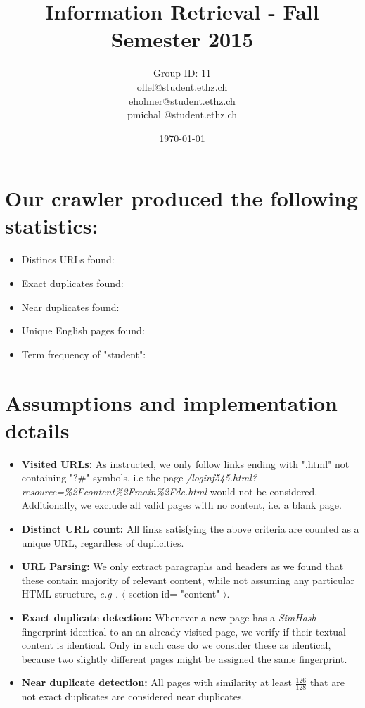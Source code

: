 \documentclass[a4paper, 11pt]{article}
\begin{document}
\title{Information Retrieval - Fall Semester 2015}
\author{Group ID: 11 \\ ollel@student.ethz.ch\\ eholmer@student.ethz.ch\\ pmichal
@student.ethz.ch\\}
\date{\today}
\maketitle

\section*{Our crawler produced the following statistics: } 
\begin{itemize}
  \item Distincs URLs found: 
  \item Exact duplicates found:
  \item Near duplicates found:
  \item Unique English pages found: 
  \item Term frequency of "student":  
\end{itemize}

\section*{Assumptions and implementation details }

\begin{itemize}
  \item \textbf{Visited URLs:} As instructed, we only follow links ending with ".html" not containing "?\#" symbols, i.e the page \textit{/loginf545.html?resource=\%2Fcontent\%2Fmain\%2Fde.html} would not be considered. Additionally, we exclude all valid pages with no content, i.e. a blank page.
  
 \item \textbf{Distinct URL count:} All links satisfying the above criteria are counted as a unique URL, regardless of duplicities.
  
  \item \textbf{URL Parsing:} We only extract paragraphs and headers as we found that these contain majority of relevant content, while not assuming any particular HTML structure, \textit{e.g
  .} $\langle$ section id= "content" $\rangle$.
  
  \item \textbf{Exact duplicate detection:} Whenever a new page has a \textit{SimHash} fingerprint identical to an an already visited page, we verify if their textual content is identical. Only in such case do we consider these as identical, because two slightly different pages might be assigned the same fingerprint.
  
  \item \textbf{Near duplicate detection:} All pages with similarity at least $\frac{126}{128}$ that are not exact duplicates are considered near duplicates.
  
  
\end{itemize}
\end{document}
